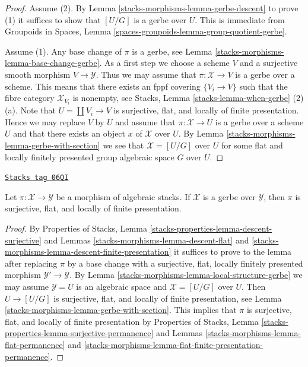 \begin{proof}
Assume (2). By
Lemma \ref{stacks-morphisms-lemma-gerbe-descent}
to prove (1) it suffices to show that $[U/G]$ is a gerbe over $U$.
This is immediate from
Groupoids in Spaces, Lemma \ref{spaces-groupoids-lemma-group-quotient-gerbe}.

\medskip\noindent
Assume (1). Any base change of $\pi$ is a gerbe, see
Lemma \ref{stacks-morphisms-lemma-base-change-gerbe}.
As a first step we choose a scheme $V$ and a surjective smooth morphism
$V \to \mathcal{Y}$. Thus we may assume that $\pi : \mathcal{X} \to V$
is a gerbe over a scheme. This means that there exists an
fppf covering $\{V_i \to V\}$ such that the fibre category
$\mathcal{X}_{V_i}$ is nonempty, see
Stacks, Lemma \ref{stacks-lemma-when-gerbe} (2)(a).
Note that $U = \coprod V_i \to V$ is surjective, flat, and
locally of finite presentation. Hence we may replace $V$ by $U$ and
assume that $\pi : \mathcal{X} \to U$ is a gerbe over a scheme $U$ and
that there exists an object $x$ of $\mathcal{X}$ over $U$. By
Lemma \ref{stacks-morphisms-lemma-gerbe-with-section}
we see that $\mathcal{X} = [U/G]$ over $U$ for some flat
and locally finitely presented group algebraic space $G$ over $U$.
\end{proof}

\begin{lemma}
\label{stacks-morphisms-lemma-gerbe-fppf}
\href{https://stacks.math.columbia.edu/tag/06QI}{\texttt{Stacks tag 06QI}}

Let $\pi : \mathcal{X} \to \mathcal{Y}$ be a morphism of algebraic stacks.
If $\mathcal{X}$ is a gerbe over $\mathcal{Y}$, then $\pi$ is surjective,
flat, and locally of finite presentation.
\end{lemma}

\begin{proof}
By
Properties of Stacks, Lemma
\ref{stacks-properties-lemma-descent-surjective}
and
Lemmas \ref{stacks-morphisms-lemma-descent-flat} and
\ref{stacks-morphisms-lemma-descent-finite-presentation}
it suffices to prove to the lemma after replacing $\pi$ by a base change
with a surjective, flat, locally finitely presented morphism
$\mathcal{Y}' \to \mathcal{Y}$. By
Lemma \ref{stacks-morphisms-lemma-local-structure-gerbe}
we may assume $\mathcal{Y} = U$ is an algebraic space and
$\mathcal{X} = [U/G]$ over $U$.
Then $U \to [U/G]$ is surjective, flat, and
locally of finite presentation, see
Lemma \ref{stacks-morphisms-lemma-gerbe-with-section}.
This implies that $\pi$ is surjective, flat, and locally
of finite presentation by
Properties of Stacks,
Lemma \ref{stacks-properties-lemma-surjective-permanence}
and
Lemmas \ref{stacks-morphisms-lemma-flat-permanence} and
\ref{stacks-morphisms-lemma-flat-finite-presentation-permanence}.
\end{proof}

